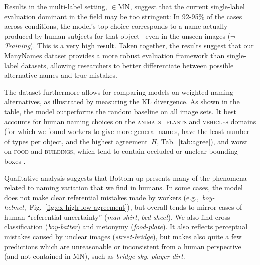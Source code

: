 Results in the multi-label setting, $\in$MN, suggest that the current single-label evaluation dominant in the field may be too stringent: In 92-95\% of the cases across conditions, the model's top choice corresponds to a name actually produced by human subjects for that object --even in the unseen images (\mbox{$\neg$\textit{Training}}).
This is a very high result.
Taken together, the results suggest that our ManyNames dataset provides a more robust evaluation framework than single-label datasets, allowing researchers to better differentiate between possible alternative names and true mistakes.

The dataset furthermore allows for comparing models on weighted naming alternatives, as illustrated by measuring the KL divergence. 
As shown in the table, the model outperforms the random baseline on all image sets. 
It best accounts for human naming choices on the \textsc{animals\_plants} and \textsc{vehicles} domains (for which we found workers to give more general names, have the least number of types per object, and the highest agreement\ $H$, Tab.\ \ref{tab:agree}), and worst on \textsc{food} and \textsc{buildings}, which tend to contain occluded or unclear bounding boxes . 

Qualitative analysis suggests that Bottom-up presents many of the phenomena related to naming variation that we find in humans.
In some cases, the model does not make clear referential mistakes made by workers (e.g.,\ \textsl{boy-helmet},\ Fig.\ \ref{fig:ex-high-low-agreement}), but overall tends to mirror cases of human ``referential uncertainty'' 
(\textsl{man-shirt}, \textsl{bed-sheet}).
We also find cross-classification (\textsl{boy-batter}) and metonymy (\textsl{food-plate}). 
It also reflects perceptual mistakes caused by unclear images (\textit{street-bridge}), but makes also quite a few predictions which are unreasonable or inconsistent from a human perspective (and not contained in MN), such as \textsl{bridge-sky}, \textsl{player-dirt}. 

